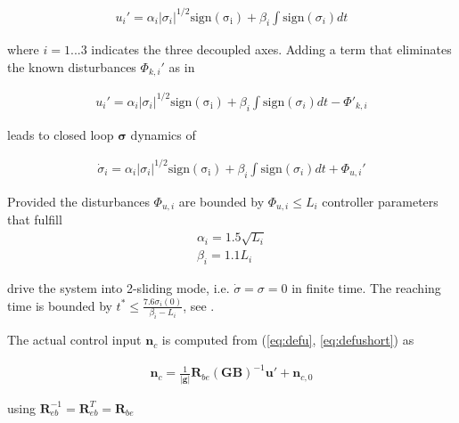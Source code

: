 \documentclass{ifacconf}
\providecommand{\mbf}[1]{\mathbf{#1}}
\begin{document}
\begin{align}
u_i' = \alpha_i |\sigma_i|^{1/2}\mathrm{sign(\sigma_i)} + \beta_i \int \mathrm{sign}(\sigma_i) dt
\end{align}

where $i = 1...3$ indicates the three decoupled axes. Adding a term that eliminates the known disturbances ${\Phi}_{k,i}'$ as in \cite{galzi2006uav}

\begin{align}
u_i' = \alpha_i |\sigma_i|^{1/2}\mathrm{sign(\sigma_i)} + \beta_i \int \mathrm{sign}(\sigma_i) dt - {\Phi}'_{k,i}
\end{align}

leads to closed loop $\mbf{\sigma}$ dynamics of

\begin{align}
\dot{\sigma}_i = \alpha_i |\sigma_i|^{1/2}\mathrm{sign(\sigma_i)} + \beta_i \int \mathrm{sign}(\sigma_i) dt + \Phi_{u,i}'
\end{align}

Provided the disturbances $\Phi_{u,i}$ are bounded by $\Phi_{u,i} \leq L_i$ controller parameters that fulfill 
\begin{align}
\alpha_i = 1.5 \sqrt{L_i}\\
\beta_i = 1.1 L_i
\label{eq:csmcgaincondition}
\end{align}

 drive the system into 2-sliding mode, i.e. $\dot{\sigma} = \sigma = 0$ in finite time. The reaching time is bounded by $t^* \leq \frac{7.6 \sigma_i(0)}{\beta_i - L_i}$, see \cite{galzi2006uav}.

The actual control input $\mbf{n}_c$ is computed from (\ref{eq:defu}, \ref{eq:defushort}) as

\begin{align}
\mbf{n}_c = \frac{1}{|\mbf{g}|} \mbf{R}_{be}(\mbf{GB})^{-1} \mbf{u}' + \mbf{n}_{c,0}
\end{align}

using $\mbf{R}_{eb}^{-1} = \mbf{R}_{eb}^{T} = \mbf{R}_{be}$
\end{document}
